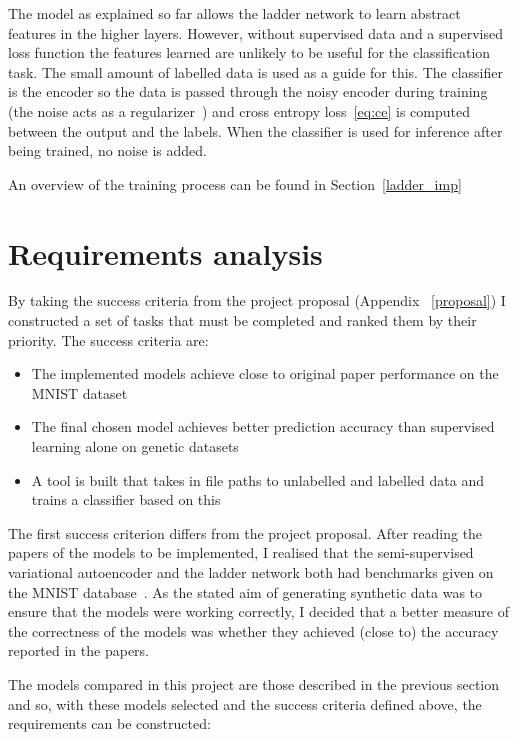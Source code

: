The model as explained so far allows the ladder network to learn abstract features in the higher layers. However, without supervised data and a supervised loss function the 
features learned are unlikely to be useful for the classification task. The small amount of labelled data is used as a guide for this. The classifier 
is the encoder so the data is passed through the noisy encoder during training (the noise acts as a regularizer~\cite{NoiseInj}) and cross entropy 
loss~\ref{eq:ce} is computed between the output and the labels. When the classifier is used for inference after being trained, no noise is 
added.

An overview of the training process can be found in Section~\ref{ladder_imp}

\section{Requirements analysis}

By taking the success criteria from the project proposal (Appendix ~\ref{proposal}) I constructed a set of tasks that must be completed 
and ranked them by their priority. The success criteria are:

\begin{itemize}
  \item The implemented models achieve close to original paper performance on the MNIST dataset 
  \item The final chosen model achieves better prediction accuracy than supervised learning alone on genetic datasets
  \item A tool is built that takes in file paths to unlabelled and labelled data and trains a classifier based on this
\end{itemize}

The first success criterion differs from the project proposal. After reading the papers of the models to be implemented, I 
realised that the semi-supervised variational autoencoder and the ladder network both had benchmarks given on 
the MNIST database~\cite{lecun-mnisthandwrittendigit-2010}. As the stated aim of generating synthetic data was to
ensure that the models were working correctly, I decided that a better measure of the correctness of the models was whether they
achieved (close to) the accuracy reported in the papers.

The models compared in this project are those described in the previous section and so, with these models selected and the success criteria 
defined above, the requirements can be constructed:

